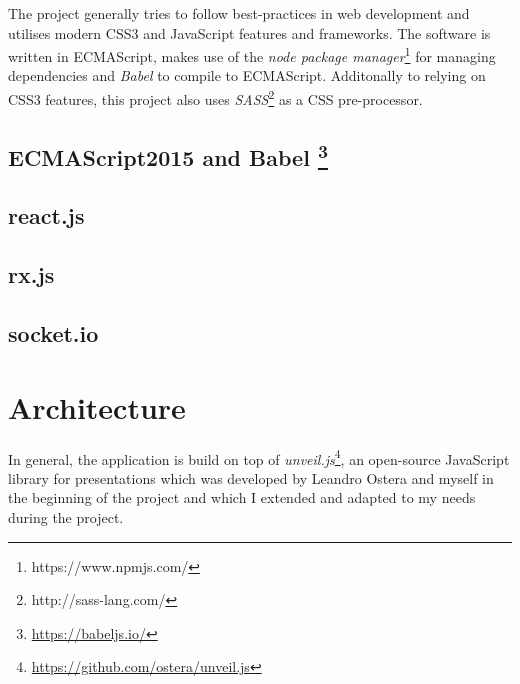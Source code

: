 The project generally tries to follow best-practices in web development and utilises modern CSS3 and JavaScript features and frameworks. The software is written in ECMA\-Script, makes use of the \textit{node package manager}\footnote{https://www.npmjs.com/} for managing dependencies and \textit{Babel} to compile to ECMA\-Script. Additonally to relying on CSS3 features, this project also uses \textit{SASS}\footnote{http://sass-lang.com/} as a CSS pre-processor.



\subsection[ECMAScript2015 and Babel]%
             {ECMAScript2015 and Babel%
             \protect\footnote{\url{https://babeljs.io/}}}%
\label{sec:implementation-architecture-es6}

\subsection{react.js}
\label{sec:implementation-architecture-react}

\subsection{rx.js}
\label{sec:implementation-architecture-rxjs}

\subsection{socket.io}
\label{sec:implementation-architecture-socketio}

\section{Architecture}
\label{sec:implementation-architecture}

In general, the application is build on top of \textit{unveil.js}\footnote{\url{https://github.com/ostera/unveil.js}}, an open-source JavaScript library for presentations which was developed by Leandro Ostera and myself in the beginning of the project and which I extended and adapted to my needs during the project.

